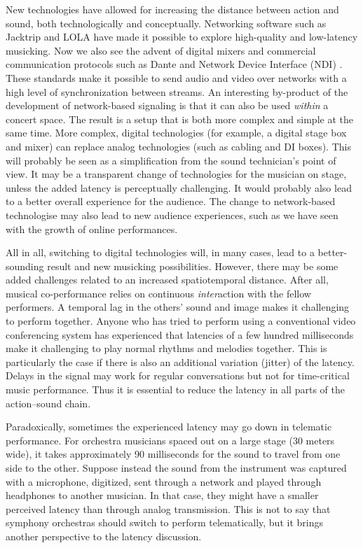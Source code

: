 New technologies have allowed for increasing the distance between action and sound, both technologically and conceptually. Networking software such as Jacktrip \citep{caceres_jacktrip_2010} and LOLA \citep{drioli_networked_2013} have made it possible to explore high-quality and low-latency musicking. Now we also see the advent of digital mixers and commercial communication protocols such as Dante \citep{williams_network_nodate} and Network Device Interface (NDI) \citep{ellerbrock_network_nodate}. These standards make it possible to send audio and video over networks with a high level of synchronization between streams.
An interesting by-product of the development of network-based signaling is that it can also be used \emph{within} a concert space. The result is a setup that is both more complex and simple at the same time. More complex, digital technologies (for example, a digital stage box and mixer) can replace analog technologies (such as cabling and DI boxes). This will probably be seen as a simplification from the sound technician's point of view. It may be a transparent change of technologies for the musician on stage, unless the added latency is perceptually challenging. It would probably also lead to a better overall experience for the audience. The change to network-based technologise may also lead to new audience experiences, such as we have seen with the growth of online performances.

All in all, switching to digital technologies will, in many cases, lead to a better-sounding result and new musicking possibilities. However, there may be some added challenges related to an increased spatiotemporal distance. After all, musical co-performance relies on continuous \emph{inter}action with the fellow performers. A temporal lag in the others' sound and image makes it challenging to perform together. Anyone who has tried to perform using a conventional video conferencing system has experienced that latencies of a few hundred milliseconds make it challenging to play normal rhythms and melodies together. This is particularly the case if there is also an additional variation (jitter) of the latency. Delays in the signal may work for regular conversations but not for time-critical music performance. Thus it is essential to reduce the latency in all parts of the action--sound chain.

Paradoxically, sometimes the experienced latency may go down in telematic performance. For orchestra musicians spaced out on a large stage (30 meters wide), it takes approximately 90 milliseconds for the sound to travel from one side to the other. Suppose instead the sound from the instrument was captured with a microphone, digitized, sent through a network and played through headphones to another musician. In that case, they might have a smaller perceived latency than through analog transmission. This is not to say that symphony orchestras should switch to perform telematically, but it brings another perspective to the latency discussion.

